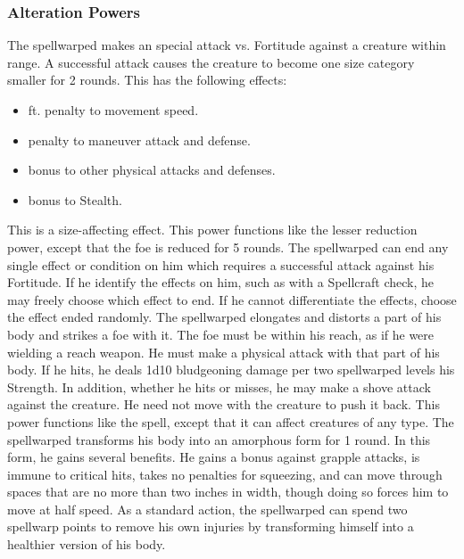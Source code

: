 \subsubsection{Alteration Powers}
The spellwarped makes an special attack vs. Fortitude against a creature within \rngclose range.
A successful attack causes the creature to become one size category smaller for 2 rounds.
This has the following effects:
\begin{itemize} 
    \item {} ft.
        penalty to movement speed.
    \item {} penalty to maneuver attack and defense.
    \item {} bonus to other physical attacks and defenses.
    \item {} bonus to Stealth.
\end{itemize}
This is a size-affecting effect.
This power functions like the lesser reduction power, except that the foe is reduced for 5 rounds.
The spellwarped can end any single effect or condition on him which requires a successful attack against his Fortitude.
If he identify the effects on him, such as with a Spellcraft check, he may freely choose which effect to end.
If he cannot differentiate the effects, choose the effect ended randomly.
The spellwarped elongates and distorts a part of his body and strikes a foe with it.
The foe must be within his reach, as if he were wielding a reach weapon.
He must make a physical attack with that part of his body.
If he hits, he deals 1d10 bludgeoning damage per two spellwarped levels \add his Strength.
In addition, whether he hits or misses, he may make a shove attack against the creature.
He need not move with the creature to push it back.
 This power functions like the 
spell, except that it can affect creatures of any type.
The spellwarped transforms his body into an amorphous form for 1 round.
In this form, he gains several benefits.
He gains a  bonus against grapple attacks, is immune to critical hits, takes no penalties for squeezing, and can move through spaces that are no more than two inches in width, though doing so forces him to move at half speed.
As a standard action, the spellwarped can spend two spellwarp points to remove his own injuries by transforming himself into a healthier version of his body.
